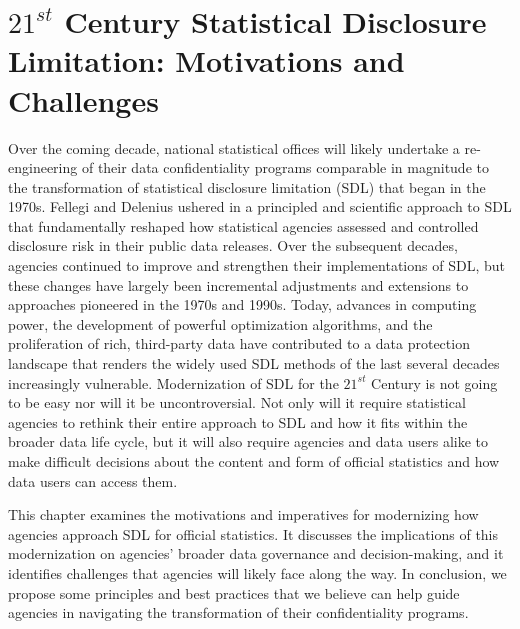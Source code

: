 \chapter{$21^{st}$ Century Statistical Disclosure Limitation: Motivations and Challenges}


Over the coming decade, national statistical offices will likely undertake a re-engineering of their data confidentiality programs comparable in magnitude to the transformation of statistical disclosure limitation (SDL) that began in the 1970s. Fellegi \cite{fellegi:1972:doi:10.1080/01621459.1972.10481199} and Delenius \cite{delenius} ushered in a principled and scientific approach to SDL that fundamentally reshaped how statistical agencies assessed and controlled disclosure risk in their public data releases. Over the subsequent decades, agencies continued to improve and strengthen their implementations of SDL, but these changes have largely been incremental adjustments and extensions to approaches pioneered in the 1970s and 1990s. Today, advances in computing power, the development of powerful optimization algorithms, and the proliferation of rich, third-party data have contributed to a data protection landscape that renders the widely used SDL methods of the last several decades increasingly vulnerable. Modernization of SDL for the $21^{st}$ Century is not going to be easy nor will it be uncontroversial. Not only will it require statistical agencies to rethink their entire approach to SDL and how it fits within the broader data life cycle, but it will also require agencies and data users alike to make difficult decisions about the content and form of official statistics and how data users can access them.

This chapter examines the motivations and imperatives for modernizing how agencies approach SDL for official statistics. It discusses the implications of this modernization on agencies' broader data governance and decision-making, and it identifies challenges that agencies will likely face along the way. In conclusion, we propose some principles and best practices that we believe can help guide agencies in navigating the transformation of their confidentiality programs. 


